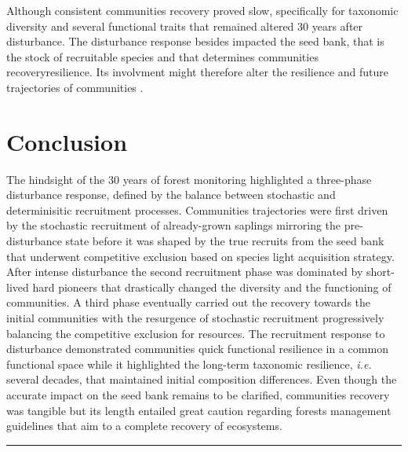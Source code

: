 \documentclass[fleqn,10pt]{ArtEcoFoG} %
\begin{document}
Although consistent communities recovery proved slow, specifically for
taxonomic diversity and several functional traits that remained altered
30 years after disturbance. The disturbance response besides impacted
the seed bank, that is the stock of recruitable species and that
determines communities recoveryresilience. Its involvment might
therefore alter the resilience and future trajectories of communities
\citep{Norden2009}.

\section{Conclusion}\label{conclusion}

The hindsight of the 30 years of forest monitoring highlighted a
three-phase disturbance response, defined by the balance between
stochastic and determinisitic recruitment processes. Communities
trajectories were first driven by the stochastic recruitment of
already-grown saplings mirroring the pre-disturbance state before it was
shaped by the true recruits from the seed bank that underwent
competitive exclusion based on species light acquisition strategy. After
intense disturbance the second recruitment phase was dominated by
short-lived hard pioneers that drastically changed the diversity and the
functioning of communities. A third phase eventually carried out the
recovery towards the initial communities with the resurgence of
stochastic recruitment progressively balancing the competitive exclusion
for resources. The recruitment response to disturbance demonstrated
communities quick functional resilience in a common functional space
while it highlighted the long-term taxonomic resilience, \emph{i.e.}
several decades, that maintained initial composition differences. Even
though the accurate impact on the seed bank remains to be clarified,
communities recovery was tangible but its length entailed great caution
regarding forests management guidelines that aim to a complete recovery
of ecosystems.

\begin{center}\rule{0.5\linewidth}{\linethickness}\end{center}



\makeatletter

\makeatother


\end{document}

